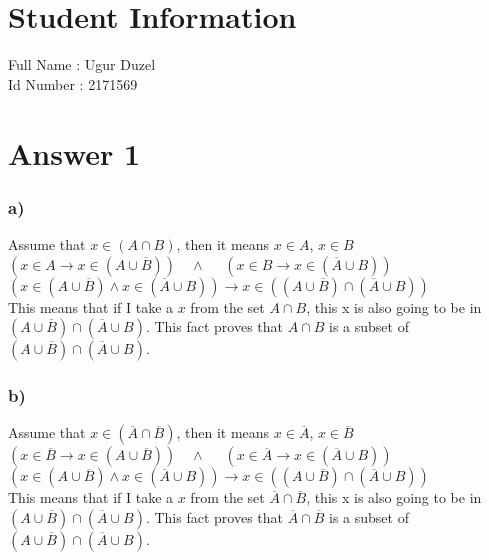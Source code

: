 \documentclass[12pt]{article}
\begin{document}
\section*{Student Information } 
Full Name : Ugur Duzel \\
Id Number :  2171569 \\

\section*{Answer 1}
\subsubsection*{a)}
\vspace{0.5cm}
\hspace{1.5cm} Assume that $x \in (A \cap B) $, then it means $x \in A$, $x \in B$ \vspace{0.1cm}\\
$(x \in A \rightarrow x \in (A \cup \overline{B})) \quad \land \quad$ 
$(x \in B \rightarrow x \in (\overline{A} \cup B))$ \\
$(x \in (A \cup \overline{B})  \land x \in (\overline{A} \cup B)) \rightarrow x \in ((A \cup \overline{B}) \cap  (\overline{A} \cup B))$ \vspace{0.2cm}\\
This means that if I take a $x$ from the set $A \cap B$, this x is also going to be in $(A \cup \overline{B}) \cap  (\overline{A} \cup B)$. This fact proves that $A \cap B$ is a subset of $(A \cup \overline{B}) \cap  (\overline{A} \cup B)$. 
\subsubsection*{b)}
\vspace{0.5cm}
\hspace{1.5cm} Assume that $x \in (\overline{A} \cap \overline{B}) $, then it means $x \in \overline{A}$, $x \in \overline{B}$ \vspace{0.1cm}\\
$(x \in \overline{B} \rightarrow x \in (A \cup \overline{B})) \quad \land \quad$ 
$(x \in \overline{A} \rightarrow x \in (\overline{A} \cup B))$ \\
$(x \in (A \cup \overline{B})  \land x \in (\overline{A} \cup B)) \rightarrow x \in ((A \cup \overline{B}) \cap  (\overline{A} \cup B))$ \vspace{0.2cm}\\
This means that if I take a $x$ from the set $\overline{A} \cap \overline{B}$, this x is also going to be in $(A \cup \overline{B}) \cap  (\overline{A} \cup B)$. This fact proves that $\overline{A} \cap \overline{B}$ is a subset of $(A \cup \overline{B}) \cap  (\overline{A} \cup B)$. 
\end{document}
